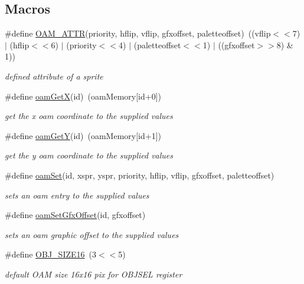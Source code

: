 \subsection*{Macros}
\begin{DoxyCompactItemize}
\item 
\#define \hyperlink{a00365_a3e2d51ca1a0ddadfbb339450c70f4f2f}{O\+A\+M\+\_\+\+A\+T\+TR}(priority,  hflip,  vflip,  gfxoffset,  paletteoffset)~((vflip$<$$<$7) $\vert$ (hflip$<$$<$6) $\vert$ (priority$<$$<$4) $\vert$ (paletteoffset$<$$<$1) $\vert$ ((gfxoffset$>$$>$8) \& 1))
\begin{DoxyCompactList}\small\item\em defined attribute of a sprite \end{DoxyCompactList}\item 
\#define \hyperlink{a00365_aefa2b9ce227904e69830a6ad981b1f19}{oam\+GetX}(id)~(oam\+Memory\mbox{[}id+0\mbox{]})
\begin{DoxyCompactList}\small\item\em get the x oam coordinate to the supplied values \end{DoxyCompactList}\item 
\#define \hyperlink{a00365_af6b605303fc7a5caa3b97fd254b5d450}{oam\+GetY}(id)~(oam\+Memory\mbox{[}id+1\mbox{]})
\begin{DoxyCompactList}\small\item\em get the y oam coordinate to the supplied values \end{DoxyCompactList}\item 
\#define \hyperlink{a00365_a2f62a591672b786d90ebb03fdf25f159}{oam\+Set}(id,  xspr,  yspr,  priority,  hflip,  vflip,  gfxoffset,  paletteoffset)
\begin{DoxyCompactList}\small\item\em sets an oam entry to the supplied values \end{DoxyCompactList}\item 
\#define \hyperlink{a00365_abec859fb490fe23b87fc34b75d8ce804}{oam\+Set\+Gfx\+Offset}(id,  gfxoffset)
\begin{DoxyCompactList}\small\item\em sets an oam graphic offset to the supplied values \end{DoxyCompactList}\item 
\mbox{\label{a00365_a35664c2c4a66c3bac8139ae093d7f3ac}} 
\#define \hyperlink{a00365_a35664c2c4a66c3bac8139ae093d7f3ac}{O\+B\+J\+\_\+\+S\+I\+Z\+E16}~(3$<$$<$5)
\begin{DoxyCompactList}\small\item\em default O\+AM size 16x16 pix for O\+B\+J\+S\+EL register \end{DoxyCompactList}\item 

\end{DoxyCompactItemize}
